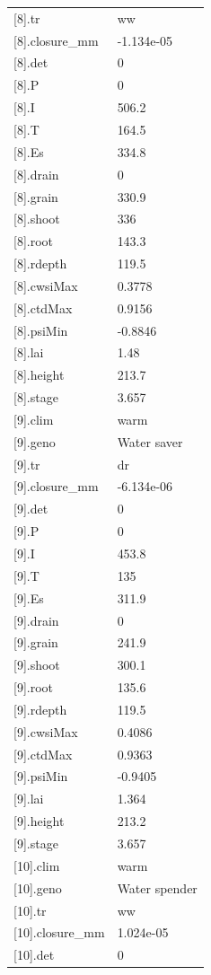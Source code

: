 {\begin{longtable}{p{}p{}}
{}[8].tr & ww\\
{}[8].closure\_mm & -1.134e-05\\
{}[8].det & 0\\
{}[8].P & 0\\
{}[8].I & 506.2\\
{}[8].T & 164.5\\
{}[8].Es & 334.8\\
{}[8].drain & 0\\
{}[8].grain & 330.9\\
{}[8].shoot & 336\\
{}[8].root & 143.3\\
{}[8].rdepth & 119.5\\
{}[8].cwsiMax & 0.3778\\
{}[8].ctdMax & 0.9156\\
{}[8].psiMin & -0.8846\\
{}[8].lai & 1.48\\
{}[8].height & 213.7\\
{}[8].stage & 3.657\\
{}[9].clim & warm\\
{}[9].geno & Water saver\\
{}[9].tr & dr\\
{}[9].closure\_mm & -6.134e-06\\
{}[9].det & 0\\
{}[9].P & 0\\
{}[9].I & 453.8\\
{}[9].T & 135\\
{}[9].Es & 311.9\\
{}[9].drain & 0\\
{}[9].grain & 241.9\\
{}[9].shoot & 300.1\\
{}[9].root & 135.6\\
{}[9].rdepth & 119.5\\
{}[9].cwsiMax & 0.4086\\
{}[9].ctdMax & 0.9363\\
{}[9].psiMin & -0.9405\\
{}[9].lai & 1.364\\
{}[9].height & 213.2\\
{}[9].stage & 3.657\\
{}[10].clim & warm\\
{}[10].geno & Water spender\\
{}[10].tr & ww\\
{}[10].closure\_mm & 1.024e-05\\
{}[10].det & 0\\

\end{longtable}}
